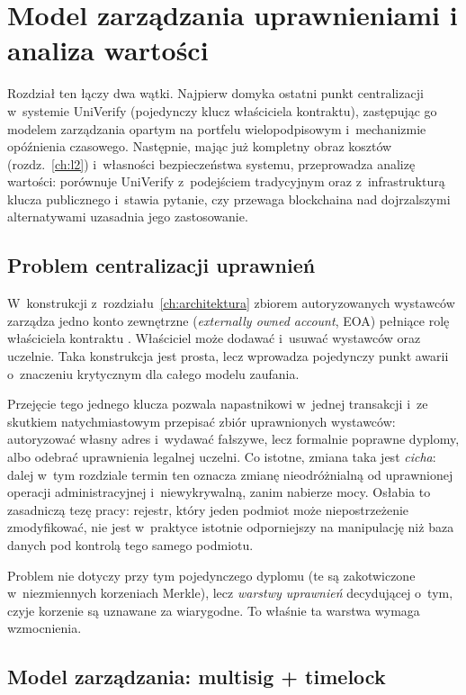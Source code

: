 \chapter{Model zarządzania uprawnieniami i analiza wartości}
\label{ch:governance}

Rozdział ten łączy dwa wątki. Najpierw domyka ostatni punkt centralizacji
w~systemie UniVerify (pojedynczy klucz właściciela kontraktu), zastępując go
modelem zarządzania opartym na portfelu wielopodpisowym i~mechanizmie opóźnienia
czasowego. Następnie, mając już kompletny obraz kosztów (rozdz.~\ref{ch:l2})
i~własności bezpieczeństwa systemu, przeprowadza analizę wartości: porównuje
UniVerify z~podejściem tradycyjnym oraz z~infrastrukturą klucza publicznego i~stawia
pytanie, czy przewaga blockchaina nad dojrzalszymi alternatywami uzasadnia jego
zastosowanie.

\section{Problem centralizacji uprawnień}
\label{sec:gov-problem}

W~konstrukcji z~rozdziału~\ref{ch:architektura} zbiorem autoryzowanych wystawców zarządza jedno konto
zewnętrzne (\emph{externally owned account}, EOA) pełniące rolę właściciela
kontraktu . Właściciel może dodawać i~usuwać wystawców oraz
uczelnie. Taka konstrukcja jest prosta, lecz wprowadza pojedynczy punkt awarii
o~znaczeniu krytycznym dla całego modelu zaufania.

Przejęcie tego jednego klucza pozwala napastnikowi w~jednej transakcji i~ze
skutkiem natychmiastowym przepisać zbiór uprawnionych wystawców: autoryzować
własny adres i~wydawać fałszywe, lecz formalnie poprawne dyplomy, albo odebrać
uprawnienia legalnej uczelni. Co istotne, zmiana taka jest \emph{cicha}: dalej
w~tym rozdziale termin ten oznacza zmianę nieodróżnialną od uprawnionej operacji
administracyjnej i~niewykrywalną, zanim nabierze mocy. Osłabia to zasadniczą tezę
pracy: rejestr, który
jeden podmiot może niepostrzeżenie zmodyfikować, nie jest w~praktyce
istotnie odporniejszy na manipulację niż baza danych pod kontrolą tego samego
podmiotu.

Problem nie dotyczy przy tym pojedynczego dyplomu (te są zakotwiczone
w~niezmiennych korzeniach Merkle), lecz \emph{warstwy uprawnień} decydującej
o~tym, czyje korzenie są uznawane za wiarygodne. To właśnie ta warstwa wymaga
wzmocnienia.

\section{Model zarządzania: multisig + timelock}
\label{sec:gov-model}


